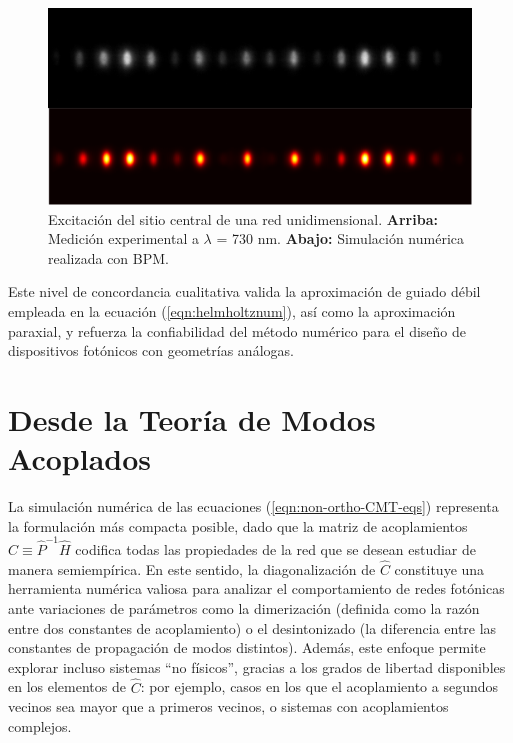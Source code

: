 \begin{figure}[H]
\centering
\includegraphics[width=\linewidth]{media/num_exp_comparison.png}
\caption[Excitación del sitio central de una red unidimensional.]{ Excitación del sitio central de una red unidimensional.
\textbf{Arriba:} Medición experimental a $\lambda$ = 730 nm.
\textbf{Abajo:} Simulación numérica realizada con BPM.
\label{fig:num-exp-comp}} \end{figure} Este nivel de concordancia cualitativa valida la aproximación de guiado débil empleada en la ecuación (\ref{eqn:helmholtznum}), así como la aproximación paraxial, y refuerza la confiabilidad del método numérico para el diseño de dispositivos fotónicos con geometrías análogas.
\section{Desde la Teoría de Modos Acoplados \label{cap:CMT}}
La simulación numérica de las ecuaciones (\ref{eqn:non-ortho-CMT-eqs}) representa la formulación más compacta posible, dado que la matriz de acoplamientos $\hat{C} \equiv \hat{P}^{-1}\hat{H}$ codifica todas las propiedades de la red que se desean estudiar de manera semiempírica. En este sentido, la diagonalización de $\hat{C}$ constituye una herramienta numérica valiosa para analizar el comportamiento de redes fotónicas ante variaciones de parámetros como la dimerización (definida como la razón entre dos constantes de acoplamiento) o el desintonizado (la diferencia entre las constantes de propagación de modos distintos). 
Además, este enfoque permite explorar incluso sistemas ``no físicos'', gracias a los grados de libertad disponibles en los elementos de $\hat{C}$: por ejemplo, casos en los que el acoplamiento a segundos vecinos sea mayor que a primeros vecinos, o sistemas con acoplamientos complejos.

